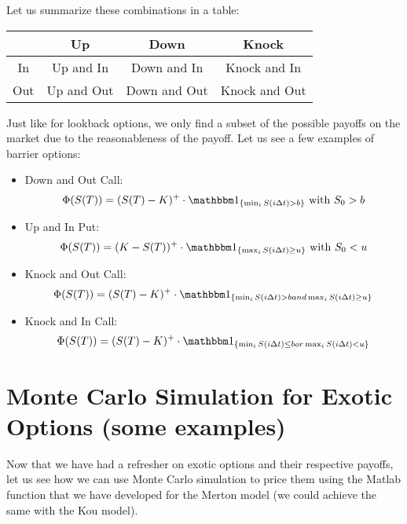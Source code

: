 Let us summarize these combinations in a table:

\begin{center}
    \begin{tabular}{|c|c|c|c|}
        \hline
        & Up & Down & Knock \\
        \hline
        In & Up and In & Down and In & Knock and In \\
        \hline
        Out & Up and Out & Down and Out & Knock and Out \\
        \hline
    \end{tabular}
\end{center}

Just like for lookback options, we only find a subset of the possible payoffs
on the market due to the reasonableness of the payoff. Let us see a few examples
of barrier options:

\begin{itemize}
    \item Down and Out Call:
        \[ \Phi(S(T)) = (S(T)-K)^+ \cdot \I_{\{ \min_i S(i\Delta t) > b \}}
        \text{ with } S_0 > b \]
    \item Up and In Put:
        \[ \Phi(S(T)) = (K-S(T))^+ \cdot \I_{\{ \max_i S(i\Delta t) \geq u \}}
        \text{ with } S_0 < u \]
    \item Knock and Out Call:
        \[ \Phi(S(T)) = (S(T)-K)^+ \cdot \I_{\{ \min_i S(i\Delta t) > b and
        \max_i S(i\Delta t) \geq u \}} \]
    \item Knock and In Call:
        \[ \Phi(S(T)) = (S(T)-K)^+ \cdot \I_{\{ \min_i S(i\Delta t) \leq b or
        \max_i S(i\Delta t) < u \}} \]
\end{itemize}

\section{Monte Carlo Simulation for Exotic Options (some examples)}
Now that we have had a refresher on exotic options and their respective payoffs,
let us see how we can use Monte Carlo simulation to price them using the Matlab
function that we have developed for the Merton model (we could achieve the same
with the Kou model).



